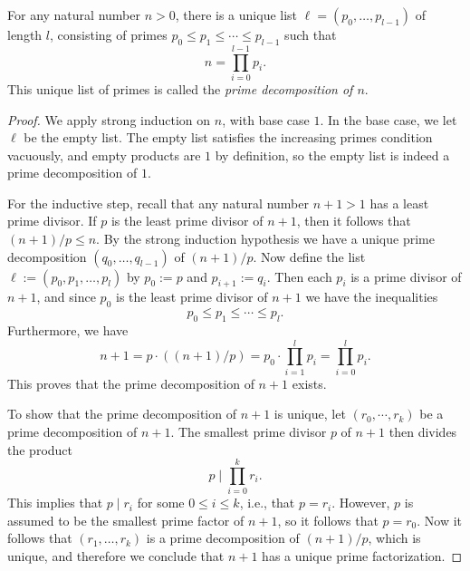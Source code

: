 \begin{theorem}\label{theorem:fundamental-theorem-of-arithmetic}
  For any natural number $n>0$, there is a unique list $\ell=(p_0,\ldots,p_{l-1})$ of length $l$, consisting of primes $p_0\leq p_1\leq \cdots \leq p_{l-1}$ such that
  \begin{equation*}
    n=\prod_{i=0}^{l-1}p_i.
  \end{equation*}
  This unique list of primes is called the \emph{prime decomposition of $n$}.
\end{theorem}

\begin{proof}
  We apply strong induction on $n$, with base case $1$. In the base case, we let $\ell$ be the empty list. The empty list satisfies the increasing primes condition vacuously, and empty products are $1$ by definition, so the empty list is indeed a prime decomposition of $1$.

  For the inductive step, recall that any natural number $n+1>1$ has a least prime divisor. If $p$ is the least prime divisor of $n+1$, then it follows that $(n+1)/p\leq n$. By the strong induction hypothesis we have a unique prime decomposition $(q_0,\ldots,q_{l-1})$ of $(n+1)/p$. Now define the list $\ell:=(p_0,p_1,\ldots,p_l)$ by $p_0:=p$ and $p_{i+1}:=q_i$. Then each $p_i$ is a prime divisor of $n+1$, and since $p_0$ is the least prime divisor of $n+1$ we have the inequalities
  \begin{equation*}
    p_0\leq p_1 \leq \cdots \leq p_l.
  \end{equation*}
  Furthermore, we have
  \begin{equation*}
    n+1 = p\cdot ((n+1)/p) = p_0 \cdot \prod_{i=1}^l p_i = \prod_{i=0}^l p_i.
  \end{equation*}
  This proves that the prime decomposition of $n+1$ exists.

  To show that the prime decomposition of $n+1$ is unique, let $(r_0,\cdots,r_k)$ be a prime decomposition of $n+1$. The smallest prime divisor $p$ of $n+1$ then divides the product
  \begin{equation*}
    p \mid \prod_{i=0}^k r_i.
  \end{equation*}
  This implies that $p\mid r_i$ for some $0\leq i \leq k$, i.e., that $p=r_i$. However, $p$ is assumed to be the smallest prime factor of $n+1$, so it follows that $p=r_0$. Now it follows that $(r_1,\ldots,r_k)$ is a prime decomposition of $(n+1)/p$, which is unique, and therefore we conclude that $n+1$ has a unique prime factorization.
\end{proof}

